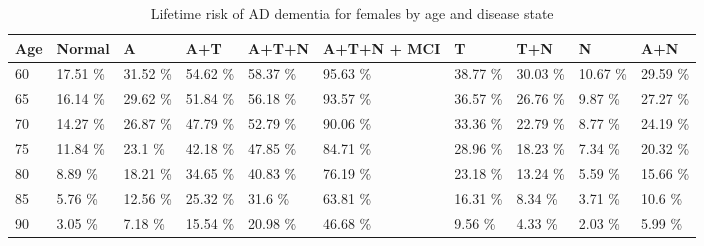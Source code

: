 \begin{table}[ht]
\centering
\begin{tabular}{llllllllll}
  \hline
Age & Normal & A & A+T & A+T+N & A+T+N + MCI & T & T+N & N & A+N \\ 
  \hline
60 & 17.51 \% & 31.52 \% & 54.62 \% & 58.37 \% & 95.63 \% & 38.77 \% & 30.03 \% & 10.67 \% & 29.59 \% \\ 
  65 & 16.14 \% & 29.62 \% & 51.84 \% & 56.18 \% & 93.57 \% & 36.57 \% & 26.76 \% & 9.87 \% & 27.27 \% \\ 
  70 & 14.27 \% & 26.87 \% & 47.79 \% & 52.79 \% & 90.06 \% & 33.36 \% & 22.79 \% & 8.77 \% & 24.19 \% \\ 
  75 & 11.84 \% & 23.1 \% & 42.18 \% & 47.85 \% & 84.71 \% & 28.96 \% & 18.23 \% & 7.34 \% & 20.32 \% \\ 
  80 & 8.89 \% & 18.21 \% & 34.65 \% & 40.83 \% & 76.19 \% & 23.18 \% & 13.24 \% & 5.59 \% & 15.66 \% \\ 
  85 & 5.76 \% & 12.56 \% & 25.32 \% & 31.6 \% & 63.81 \% & 16.31 \% & 8.34 \% & 3.71 \% & 10.6 \% \\ 
  90 & 3.05 \% & 7.18 \% & 15.54 \% & 20.98 \% & 46.68 \% & 9.56 \% & 4.33 \% & 2.03 \% & 5.99 \% \\ 
   \hline
\end{tabular}
\caption{Lifetime risk of AD dementia for females by age and disease state} 
\end{table}
